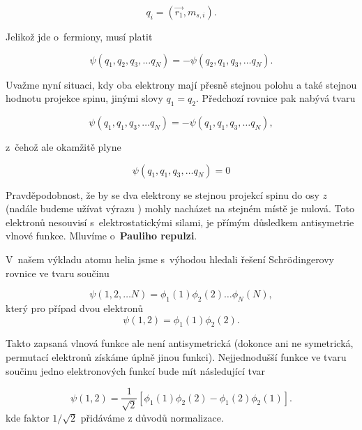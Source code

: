 \begin{equation}
q_i = (\vec{r_1},m_{s,i}).
\label{rov:VE-28}
\end{equation}

\noindent Jelikož jde o~fermiony, musí platit 

\begin{equation}
\psi(q_1,q_2,q_3, \dots q_N) = -\psi(q_2,q_1,q_3, \dots q_N).
\label{rov:VE-29}
\end{equation}

Uvažme nyní situaci, kdy oba elektrony mají přesně stejnou polohu a také stejnou hodnotu projekce spinu, jinými slovy $q_1 = q_2$. Předchozí rovnice pak nabývá tvaru

\begin{equation}
\psi(q_1,q_1,q_3, \dots q_N) = - \psi(q_1,q_1,q_3, \dots q_N),
\label{rov:VE-30}
\end{equation}

\noindent z~čehož ale okamžitě plyne

\begin{equation}
\psi(q_1,q_1,q_3, \dots q_N) = 0
\label{rov:VE-31}
\end{equation}

\noindent Pravděpodobnost, že by se dva elektrony se stejnou projekcí spinu do osy $z$ (nadále budeme užívat výrazu ) mohly nacházet na stejném místě je nulová. Toto  elektronů nesouvisí s~elektrostatickými silami, je přímým důsledkem antisymetrie vlnové funkce. Mluvíme o~\textbf{Pauliho repulzi}.

V~našem výkladu atomu helia jsme s~výhodou hledali řešení Schr\"odingerovy rovnice ve tvaru součinu

\begin{equation}
\psi(1,2, \dots N) = \phi_1(1)\phi_2(2) \dots \phi_N(N),
\label{rov:VE-32}
\end{equation}
který pro případ dvou elektronů
\begin{equation}
\psi(1,2) = \phi_1(1) \phi_2(2). \nonumber
\end{equation}

\noindent Takto zapsaná vlnová funkce ale není antisymetrická (dokonce ani ne symetrická, permutací elektronů získáme úplně jinou funkci). Nejjednodušší funkce ve tvaru součinu jedno elektronových funkcí bude mít následující tvar

\begin{equation}
\psi(1,2) = \frac{1}{\sqrt{2}} \left[ \phi_1(1)\phi_2(2) - \phi_1(2)\phi_2(1) \right].
\label{rov:VE-33}
\end{equation}
kde faktor $1/\sqrt{2}$ přidáváme z důvodů normalizace.

